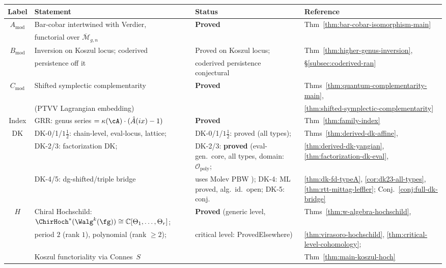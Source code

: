 \begin{center}
\renewcommand{\arraystretch}{1.3}
\begin{tabular}{@{}cp{4.4cm}p{3.8cm}p{4.6cm}@{}}
\toprule
\textbf{Label} & \textbf{Statement} & \textbf{Status} & \textbf{Reference} \\
\midrule
$A_{\mathrm{mod}}$ & Bar-cobar intertwined with Verdier, & \textbf{Proved} & Thm~\ref{thm:bar-cobar-isomorphism-main} \\
  & functorial over $\overline{\mathcal{M}}_{g,n}$ & & \\[2pt]
$B_{\mathrm{mod}}$ & Inversion on Koszul locus; coderived & Proved on Koszul locus; & Thm~\ref{thm:higher-genus-inversion}, \\
  & persistence off it & coderived persistence conjectural & \S\ref{subsec:coderived-ran} \\[2pt]
$C_{\mathrm{mod}}$ & Shifted symplectic complementarity & \textbf{Proved} & Thms~\ref{thm:quantum-complementarity-main}, \\
  & (PTVV Lagrangian embedding) & & \ref{thm:shifted-symplectic-complementarity} \\[2pt]
Index & GRR: genus series $= \kappa(\cA) \cdot (\hat{A}(ix) - 1)$ & \textbf{Proved} & Thm~\ref{thm:family-index} \\[2pt]
DK & DK-0/1/$1\frac{1}{2}$: chain-level, eval-locus, lattice; & DK-0/1/$1\frac{1}{2}$: proved (all types); & Thms~\ref{thm:derived-dk-affine}, \\
  & DK-2/3: factorization DK; & DK-2/3: \textbf{proved} (eval-gen.\ core, all types, domain: $\mathcal{O}_{\mathrm{poly}}$; & \ref{thm:derived-dk-yangian}, \ref{thm:factorization-dk-eval}, \\
  & DK-4/5: dg-shifted/triple bridge & uses Molev PBW \cite{molev-yangians}); DK-4: ML proved, alg.\ id.\ open; DK-5: conj. & \ref{thm:dk-fd-typeA}, \ref{cor:dk23-all-types}, \ref{thm:rtt-mittag-leffler}; Conj.~\ref{conj:full-dk-bridge} \\[2pt]
$H$ & Chiral Hochschild: $\ChirHoch^*(\Walg^k(\fg)) \cong \mathbb{C}[\Theta_1,\ldots,\Theta_r]$; & \textbf{Proved} (generic level, & Thms~\ref{thm:w-algebra-hochschild}, \\
  & period $2$ (rank $1$), polynomial (rank $\geq 2$); & critical level: ProvedElsewhere) & \ref{thm:virasoro-hochschild}, \ref{thm:critical-level-cohomology}; \\
  & Koszul functoriality via Connes~$S$ & & Thm~\ref{thm:main-koszul-hoch} \\
\bottomrule
\end{tabular}
\end{center}

